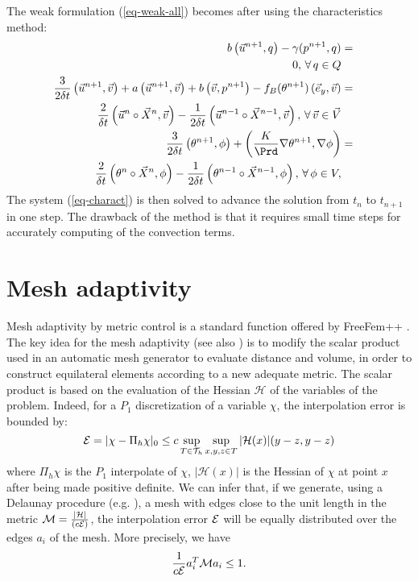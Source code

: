 The weak formulation  (\ref{eq-weak-all}) becomes after using the characteristics method:
\begin{eqnarray}
\label{eq-charact}
b\left(\vec{u}^{n+1}, q\right) - \gamma (p^{n+1},q)&=& \\ \nonumber
0, \, \forall \, q \in Q \\ \nonumber
\frac{3}{2 \delta t} \left(\vec{u}^{n+1},\vec{v}\right) +
a\left(\vec{u}^{n+1}, \vec{v}\right) 
+ b\left(\vec{v}, p^{n+1}\right) 
- f_B(\theta^{n+1}) \left(\vec{e}_y,\vec{v}\right)
&=& \\ \nonumber
\frac{2}{\delta t} \left(\vec{u}^{n}\circ \vec{X}^n,\vec{v}\right) - \frac{1}{2 \delta t} \left(\vec{u}^{n-1}\circ \vec{X}^{n-1},\vec{v}\right), \, \forall \, \vec{v} \in \vec{V}\\  \nonumber
\frac{3}{2 \delta t} \left(\theta^{n+1}, \phi\right)  
+
\left( \frac{K}{\Prd} \nabla \theta^{n+1}, \nabla \phi \right) &=& \\ \nonumber
 \frac{2}{\delta t} \left(\theta^{n}\circ \vec{X}^n, \phi\right) -  \frac{1}{2 \delta t} \left(\theta^{n-1}\circ \vec{X}^{n-1}, \phi\right), \, \forall \, \phi \in V,
\end{eqnarray}
The system (\ref{eq-charact}) is then solved to advance the solution from $t_n$ to $t_{n+1}$ in one step. The drawback of the method is that it requires small time steps for accurately computing of the convection terms. 

 \section{Mesh adaptivity} \label{subs:FEadapt}

Mesh adaptivity by metric control is a standard function offered by FreeFem++ \citep{hecht-2012-JNM}. The key idea for the mesh adaptivity (see also \cite{hecht-2000-ijnmf,hecht-1997-aiaa,george-1998}) is to modify the scalar product used in an automatic mesh generator to evaluate distance and volume, in order to  construct equilateral elements according to a new adequate metric.  The scalar
product is based on the evaluation of the Hessian $\mathcal{H}$ of the variables of the problem. Indeed, for a $P_1$ discretization of a
variable $\chi$, the interpolation error is bounded by:
\begin{equation}
{\cal E } = |\chi - \Pi_h \chi |_0 \leq c \sup_{T\in \mathcal{T}_{h}} \sup_{x,y,z\in T}   |\mathcal{H}(x)|(y-z , y-z)
\label{eq1}
\end{equation}
where $\Pi_h \chi $ is the $P_1$ interpolate  of $\chi$, $ |\mathcal{H}(x)|$ is the  Hessian of $\chi$ at point $x$ after being made positive definite.
We can infer that, if we generate, using  a Delaunay procedure (e.g. \cite{george-1998}), a  mesh with edges close to the unit length  in the metric  $\mathcal{M} ={|\mathcal{H}| \over (c {\cal{E}})}$, the interpolation error ${\cal E}$ will be equally distributed over the edges $a_i$ of the mesh. More precisely, we have
\begin{equation}
{1 \over c {\cal E}} a_i^T {\cal M } a_i \le 1.
\end{equation}

